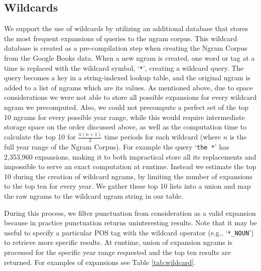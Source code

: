 \documentclass[11pt]{article}
\newcommand{\query}[1]{\texttt{#1}}
\begin{document}
\subsection{Wildcards}
\label{sec:wildcards}
	We support the use of wildcards by utilizing an additional database that stores the most frequent expansions of queries to the ngram corpus. This wildcard database is created as a pre-compilation step when creating the Ngram Corpus from the Google Books data. When a new ngram is created, one word or tag at a time is replaced with the wildcard symbol, `\query{*}', creating a wildcard query. The query becomes a key in a string-indexed lookup table, and the original ngram is added to a list of ngrams which are its values. As mentioned above, due to space considerations we were not able to store all possible expansions for every wildcard ngram we precomputed. Also, we could not precompute a perfect set of the top 10 ngrams for every possible year range, while this would require intermediate storage space on the order discussed above, as well as the computation time to calculate the top 10 for $\frac{n(n+1)}{2}$ time periods for each wildcard (where $n$ is the full year range of the Ngram Corpus). For example the query `\query{the *}' has 2,353,960 expansions, making it to both impractical store all its replacements and impossible to serve an exact computation at runtime. Instead we estimate the top 10 during the creation of wildcard ngrams, by limiting the number of expansions to the top ten for every year. We gather these top 10 lists into a union and map the raw ngrams to the wildcard ngram string in our table. 
	
	During this process, we filter punctuation from consideration as a valid expansion because in practice punctuation returns uninteresting results. Note that it may be useful to specify a particular POS tag with the wildcard operator (e.g., `\query{*\_NOUN}') to retrieve more specific results. At runtime, union of expansion ngrams is processed for the specific year range requested and the top ten results are returned. For examples of expansions see Table \ref{tab:wildcard}. 
\end{document}
